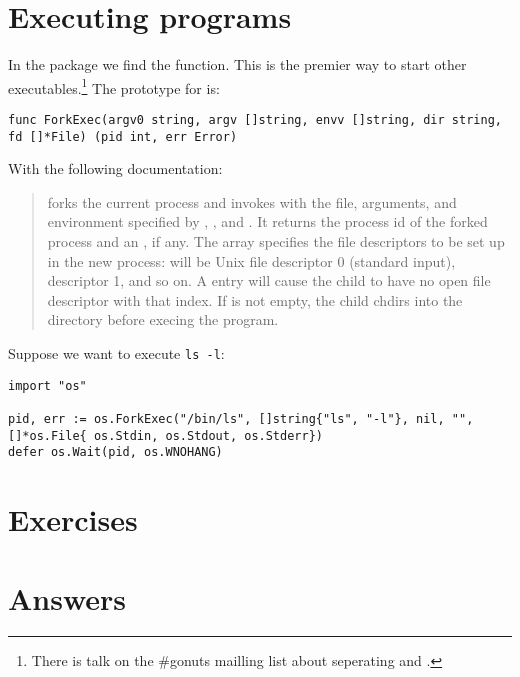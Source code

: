 \section{Executing programs}
In the  package we find the  function. This
is the premier way to start other executables.\footnote{There is talk on
the \#gonuts mailling list about seperating  and
.} 
The prototype for  is:
\begin{lstlisting}
func ForkExec(argv0 string, argv []string, envv []string, dir string, fd []*File) (pid int, err Error)
\end{lstlisting}
With the following documentation:
\begin{quote}
 forks the current process and invokes  with the
file, arguments, and environment specified by , , and
. It returns the process id of the forked process and an
, if any. The  array specifies the file descriptors to be
set up in the new process:  will be Unix file descriptor 0 (standard
input),  descriptor 1, and so on.  A  entry will cause the
child to have no open file descriptor with that index.  If  is not
empty, the child chdirs into the directory before execing the program.
\end{quote}
Suppose we want to execute \verb|ls -l|:
\begin{lstlisting}
import "os"

pid, err := os.ForkExec("/bin/ls", []string{"ls", "-l"}, nil, "", []*os.File{ os.Stdin, os.Stdout, os.Stderr})
defer os.Wait(pid, os.WNOHANG)
\end{lstlisting}


\section{Exercises}


\cleardoublepage
\section{Answers}
\shipoutAnswer
